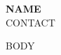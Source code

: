 \documentclass[11pt,letterpaper]{article}
\begin{document}
{\large\bfseries {{NAME}}}\\
{\small {{CONTACT}}}


{{BODY}}
\end{document}

